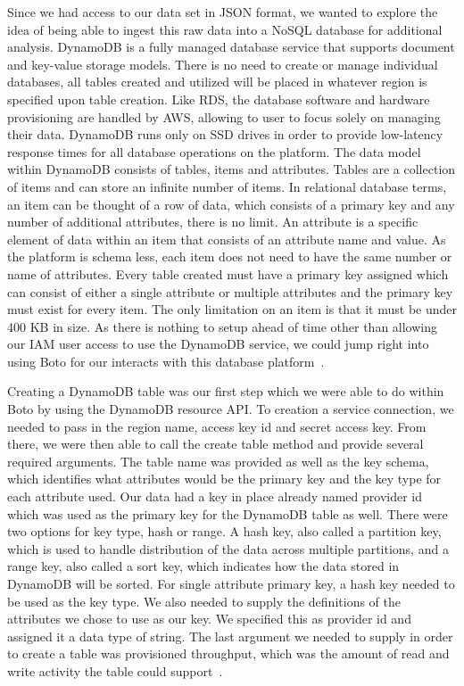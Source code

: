 Since we had access to our data set in JSON format, we wanted to explore the 
idea of being able to ingest this raw data into a NoSQL database for 
additional analysis. DynamoDB is a fully managed database service that 
supports document and key-value storage models. There is no need to create 
or manage individual databases, all tables created and utilized will be 
placed in whatever region is specified upon table creation. Like RDS, the 
database software and hardware provisioning are handled by AWS, allowing 
to user to focus solely on managing their data. DynamoDB runs only on SSD 
drives in order to provide low-latency response times for all database 
operations on the platform. The data model within DynamoDB consists of 
tables, items and attributes. Tables are a collection of items and can store 
an infinite number of items. In relational database terms, an item can be 
thought of a row of data, which consists of a primary key and any number of 
additional attributes, there is no limit. An attribute is a specific element 
of data within an item that consists of an attribute name and value. As the 
platform is schema less, each item does not need to have the same number or 
name of attributes. Every table created must have a primary key assigned which 
can consist of either a single attribute or multiple attributes and the 
primary key must exist for every item. The only limitation on an item is that 
it must be under 400 KB in size. As there is nothing to setup ahead of time 
other than allowing our IAM user access to use the DynamoDB service, we could 
jump right into using Boto for our interacts with this database 
platform~\cite{hid-sp18-521-dynamodbfaq}. 

Creating a DynamoDB table was our first step which we were able to do within 
Boto by using the DynamoDB resource API. To creation a service connection, we 
needed to pass in the region name, access key id and secret access key. From 
there, we were then able to call the create table method and provide several 
required arguments. The table name was provided as well as the key schema, 
which identifies what attributes would be the primary key and the key type 
for each attribute used. Our data had a key in place already named provider id 
which was used as the primary key for the DynamoDB table as well. There were 
two options for key type, hash or range. A hash key, also called a partition 
key, which is used to handle distribution of the data across multiple 
partitions, and a range key, also called a sort key, which indicates how the 
data stored in DynamoDB will be sorted. For single attribute primary key, a 
hash key needed to be used as the key type. We also needed to supply the 
definitions of the attributes we chose to use as our key. We specified this 
as provider id and assigned it a data type of string. The last argument we 
needed to supply in order to create a table was provisioned throughput, which 
was the amount of read and write activity the table could 
support~\cite{hid-sp18-521-dynamodbfaq}.  

